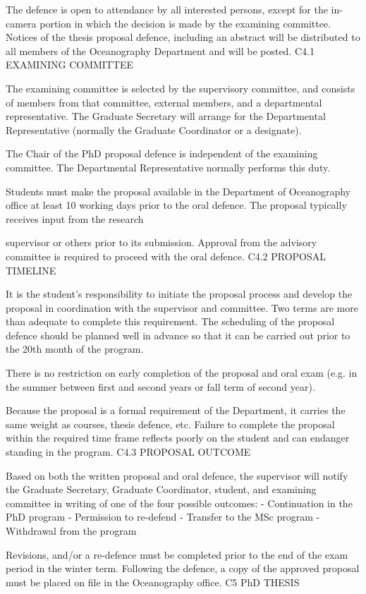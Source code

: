 \documentclass{article}
\begin{document}
The defence is open to attendance by all interested persons, except for the in-camera portion in which the decision is made by the examining committee. Notices of the thesis proposal defence, including an abstract will be distributed to all members of the Oceanography Department and will be posted.
C4.1	EXAMINING COMMITTEE

The examining committee is selected by the supervisory committee, and consists of members from that committee, external members, and a departmental representative. The Graduate Secretary will arrange for the Departmental Representative (normally the Graduate Coordinator or a designate).

The Chair of the PhD proposal defence is independent of the examining committee. The Departmental Representative normally performs this duty.

Students must make the proposal available in the Department of Oceanography office at least 10 working days prior to the oral defence.  The proposal typically receives input from the research
 

supervisor or others prior to its submission. Approval from the advisory committee is required to proceed with the oral defence.
C4.2	PROPOSAL TIMELINE

It is the student's responsibility to initiate the proposal process and develop the proposal in coordination with the supervisor and committee. Two terms are more than adequate to complete this requirement. The scheduling of the proposal defence should be planned well in advance so that it can be carried out prior to the 20th month of the program.

There is no restriction on early completion of the proposal and oral exam (e.g. in the summer between first and second years or fall term of second year).

Because the proposal is a formal requirement of the Department, it carries the same weight as courses, thesis defence, etc. Failure to complete the proposal within the required time frame reflects poorly on the student and can endanger standing in the program.
C4.3	PROPOSAL OUTCOME

Based on both the written proposal and oral defence, the supervisor will notify the Graduate Secretary, Graduate Coordinator, student, and examining committee in writing of one of the four possible outcomes:
-	Continuation in the PhD program
-	Permission to re-defend
-	Transfer to the MSc program
-	Withdrawal from the program

Revisions, and/or a re-defence must be completed prior to the end of the exam period in the winter term. Following the defence, a copy of the approved proposal must be placed on file in the Oceanography office.
C5	PhD THESIS
\end{document}
